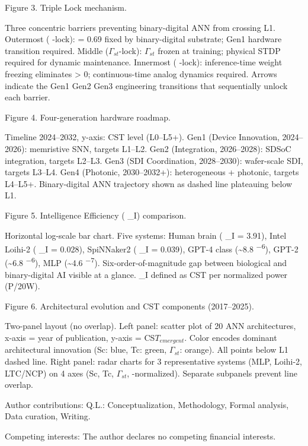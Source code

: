 \documentclass[a4paper,12pt]{article}
\begin{document}
Figure 3. Triple Lock mechanism.

Three concentric barriers preventing binary-digital ANN from crossing L1.
Outermost ( \alpha -lock):  \alpha  = 0.69 fixed by binary-digital substrate; Gen1 hardware transition required.
Middle ($\Gamma_{st}$-lock): $\Gamma_{st}$ frozen at training; physical STDP required for dynamic maintenance.
Innermost ( \Psi -lock): inference-time weight freezing eliminates  \Psi  > 0; continuous-time analog dynamics required.
Arrows indicate the Gen1 \rightarrow Gen2 \rightarrow Gen3 engineering transitions that sequentially unlock each barrier.

Figure 4. Four-generation hardware roadmap.

Timeline 2024--2032, y-axis: CST level (L0--L5+). Gen1 (Device Innovation, 2024--2026): memristive SNN, targets L1--L2. Gen2 (Integration, 2026--2028): SDSoC integration, targets L2--L3. Gen3 (SDI Coordination, 2028--2030): wafer-scale SDI, targets L3--L4. Gen4 (Photonic, 2030--2032+): heterogeneous + photonic, targets L4--L5+. Binary-digital ANN trajectory shown as dashed line plateauing below L1.

Figure 5. Intelligence Efficiency ( \eta \_I) comparison.

Horizontal log-scale bar chart. Five systems: Human brain ( \eta \_I = 3.91), Intel Loihi-2 ( \eta \_I = 0.028), SpiNNaker2 ( \eta \_I = 0.039), GPT-4 class (\textasciitilde{}8.8 \textsuperscript{$-$}\textsuperscript{6}), GPT-2 (\textasciitilde{}6.8 \textsuperscript{$-$}\textsuperscript{6}), MLP (\textasciitilde{}4.6 \textsuperscript{$-$}\textsuperscript{7}). Six-order-of-magnitude gap between biological and binary-digital AI visible at a glance.  \eta \_I defined as CST per normalized power (P/20W).

Figure 6. Architectural evolution and CST components (2017--2025).

Two-panel layout (no overlap). Left panel: scatter plot of 20 ANN architectures, x-axis = year of publication, y-axis = CS$T_{emergent}$. Color encodes dominant architectural innovation (Sc: blue, Tc: green, $\Gamma_{st}$: orange). All points below L1 dashed line. Right panel: radar charts for 3 representative systems (MLP, Loihi-2, LTC/NCP) on 4 axes (Sc, Tc, $\Gamma_{st}$,  \alpha -normalized). Separate subpanels prevent line overlap.

Author contributions: Q.L.: Conceptualization, Methodology, Formal analysis, Data curation, Writing.

Competing interests: The author declares no competing financial interests.
\end{document}

